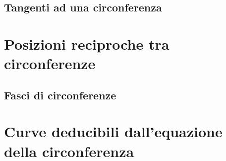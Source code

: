 \subsection{Tangenti ad una circonferenza}
\label{subsec:circ_tangenti}

\section{Posizioni reciproche tra circonferenze}
\label{sec:circ_posizionireciproche}

\subsection{Fasci di circonferenze}
\label{subsec:circ_fasci}

\section{Curve deducibili dall'equazione della circonferenza}
\label{sec:circ_posizionireciproche}


